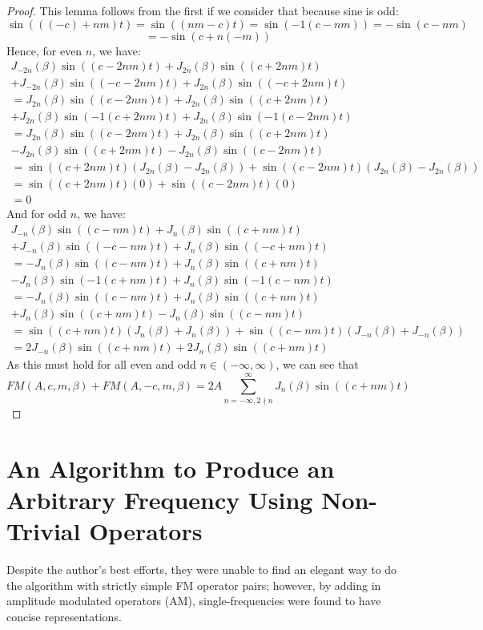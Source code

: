 \documentclass[11pt,twoside]{report}
\numberwithin{thm}{section}
\numberwithin{equation}{section}
\begin{document}
\begin{proof} This lemma follows from the first if we consider that because sine is odd:
$$\sin(((-c) + nm)t) = \sin((nm -c)t) = \sin(-1(c - nm)) = -\sin(c - nm)$$
$$= -\sin(c + n(-m))$$
Hence, for even $n$, we have:
\begin{align*}
    J_{-2n}(\beta)\sin((c-2nm)t) + J_{2n}(\beta)\sin((c+2nm)t) \\
    + J_{-2n}(\beta)\sin((-c-2nm)t) + J_{2n}(\beta)\sin((-c+2nm)t) \\
     = J_{2n}(\beta)\sin((c-2nm)t) + J_{2n}(\beta)\sin((c+2nm)t) \\
    + J_{2n}(\beta)\sin(-1(c+2nm)t) + J_{2n}(\beta)\sin(-1(c-2nm)t) \\
    = J_{2n}(\beta)\sin((c-2nm)t) + J_{2n}(\beta)\sin((c+2nm)t) \\
    - J_{2n}(\beta)\sin((c+2nm)t) - J_{2n}(\beta)\sin((c-2nm)t) \\
    =\sin((c+2nm)t)(J_{2n}(\beta) - J_{2n}(\beta)) + \sin((c-2nm)t)(J_{2n}(\beta)- J_{2n}(\beta)) \\
    =\sin((c+2nm)t)(0) + \sin((c-2nm)t)(0) \\
    = 0
\end{align*}
And for odd $n$, we have:
\begin{align*}
    J_{-n}(\beta)\sin((c-nm)t) + J_{n}(\beta)\sin((c+nm)t) \\
    + J_{-n}(\beta)\sin((-c-nm)t) + J_{n}(\beta)\sin((-c+nm)t) \\
     = -J_{n}(\beta)\sin((c-nm)t) + J_{n}(\beta)\sin((c+nm)t) \\
    - J_{n}(\beta)\sin(-1(c+nm)t) + J_{n}(\beta)\sin(-1(c-nm)t) \\
    = - J_{n}(\beta)\sin((c-nm)t) + J_{n}(\beta)\sin((c+nm)t) \\
    + J_{n}(\beta)\sin((c+nm)t) - J_{n}(\beta)\sin((c-nm)t) \\
    =\sin((c+nm)t)(J_{n}(\beta) + J_{n}(\beta)) + \sin((c-nm)t)(J_{-n}(\beta) + J_{-n}(\beta)) \\
    = 2J_{-n}(\beta)\sin((c+nm)t) + 2J_{n}(\beta)\sin((c+nm)t)
\end{align*}
As this must hold for all even and odd $n \in (-\infty, \infty)$, we can see that 
$$FM(A, c, m, \beta) + FM(A, -c, m, \beta) = 2A\sum_{n=-\infty, 2\nmid n}^\infty J_{n}(\beta)\sin((c + nm)t) $$
\end{proof}

\section*{An Algorithm to Produce an Arbitrary Frequency Using Non-Trivial Operators}
\label{sec:2_4}
 Despite the author's best efforts, they were unable to find an elegant way to do the algorithm with strictly simple FM operator pairs; however, by adding in amplitude modulated operators (AM), single-frequencies were found to have concise representations.\\
\end{document}
